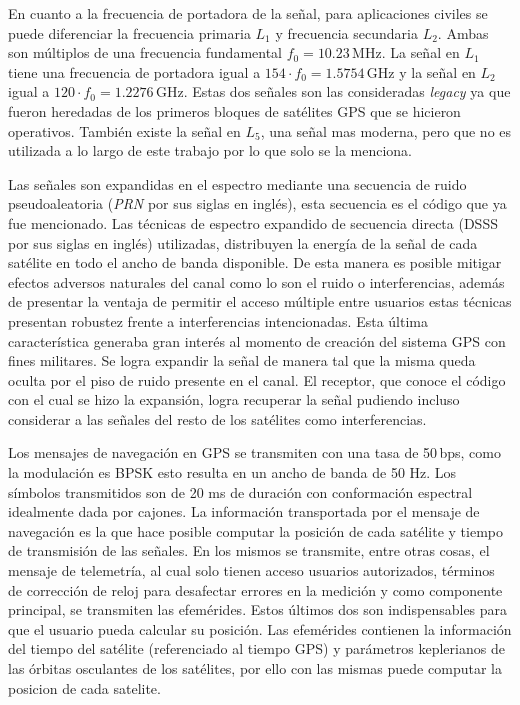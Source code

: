 \documentclass[a4paper,12pt,oneside,onecolumn,final,openright]{book}%
\begin{document}
	En cuanto a la frecuencia de portadora de la señal, para aplicaciones civiles se puede diferenciar la frecuencia primaria $L_1$ y frecuencia secundaria $L_2$. Ambas son múltiplos de una frecuencia fundamental $f_0=10.23$\,MHz. La señal en $L_1$ tiene una frecuencia de portadora igual a $154\cdot f_0 = 1.5754$\,GHz y la señal en $L_2$ igual a $120\cdot f_0 = 1.2276$\,GHz. Estas dos señales son las consideradas \textit{legacy} ya que fueron heredadas de los primeros bloques de satélites GPS que se hicieron operativos. También existe la señal en $L_5$, una señal mas moderna, pero que no es utilizada a lo largo de este trabajo por lo que solo se la menciona.
	
	Las señales son expandidas en el espectro mediante una secuencia de ruido pseudoaleatoria (\textit{PRN} por sus siglas en inglés), esta secuencia es el código que ya fue mencionado. Las técnicas de espectro expandido de secuencia directa (DSSS por sus siglas en inglés) utilizadas, distribuyen la energía de la señal de cada satélite en todo el ancho de banda disponible. De esta manera es posible mitigar efectos adversos naturales del canal como lo son el ruido o interferencias, además de presentar la ventaja de permitir el acceso múltiple entre usuarios estas técnicas presentan robustez frente a interferencias intencionadas. Esta última característica generaba gran interés al momento de creación del sistema GPS con fines militares. Se logra expandir la señal de manera tal que la misma queda oculta por el piso de ruido presente en el canal. El receptor, que conoce el código con el cual se hizo la expansión, logra recuperar la señal pudiendo incluso considerar a las señales del resto de los satélites como interferencias. 
	
	Los mensajes de navegación en GPS se transmiten con una tasa de 50\,bps, como la modulación es BPSK esto resulta en un ancho de banda de 50 Hz. Los símbolos transmitidos son de 20 ms de duración con conformación espectral idealmente dada por cajones. La información transportada por el mensaje de navegación es la que hace posible computar la posición de cada satélite y tiempo de transmisión de las señales. En los mismos se transmite, entre otras cosas, el mensaje de telemetría, al cual solo tienen acceso usuarios autorizados, términos de corrección de reloj para desafectar errores en la medición y como componente principal, se transmiten las efemérides. Estos últimos dos son indispensables para que el usuario pueda calcular su posición. Las efemérides contienen la información del tiempo del satélite (referenciado al tiempo GPS) y parámetros keplerianos de las órbitas osculantes de los satélites, por ello con las mismas puede computar la posicion de cada satelite.
	
\end{document}

